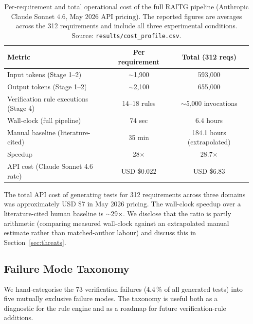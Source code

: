 \documentclass[sigconf,nonacm,review]{acmart}
\begin{document}
\begin{table}[!ht]
\centering
\caption{Per-requirement and total operational cost of the full
RAITG pipeline (Anthropic Claude Sonnet 4.6, May 2026 API pricing).
The reported figures are averages across the 312 requirements and
include all three experimental conditions. Source:
\texttt{results/cost\_profile.csv}.}
\label{tab:cost_e}
\small
\begin{tabular}{lcc}
\toprule
Metric                                  & Per requirement & Total (312 reqs) \\
\midrule
Input tokens (Stage 1--2)               & $\sim$1{,}900   & 593{,}000 \\
Output tokens (Stage 1--2)              & $\sim$2{,}100   & 655{,}000 \\
Verification rule executions (Stage 4)  & 14--18 rules    & $\sim$5{,}000 invocations \\
Wall-clock (full pipeline)              & 74 sec          & 6.4 hours \\
Manual baseline (literature-cited)      & 35 min          & 184.1 hours (extrapolated) \\
Speedup                                 & 28$\times$      & 28.7$\times$ \\
API cost (Claude Sonnet 4.6 rate)       & USD \$0.022     & USD \$6.83 \\
\bottomrule
\end{tabular}
\end{table}

The total API cost of generating tests for 312 requirements across
three domains was approximately USD \$7 in May 2026 pricing. The
wall-clock speedup over a literature-cited human baseline is
$\sim$29$\times$. We disclose that the ratio is partly arithmetic
(comparing measured wall-clock against an extrapolated manual
estimate rather than matched-author labour) and discuss this in
Section~\ref{sec:threats}.

\subsection{Failure Mode Taxonomy}
\label{sec:failure_modes}

We hand-categorise the 73 verification failures (4.4\,\% of all
generated tests) into five mutually exclusive failure modes. The
taxonomy is useful both as a diagnostic for the rule engine and as a
roadmap for future verification-rule additions.
\end{document}
